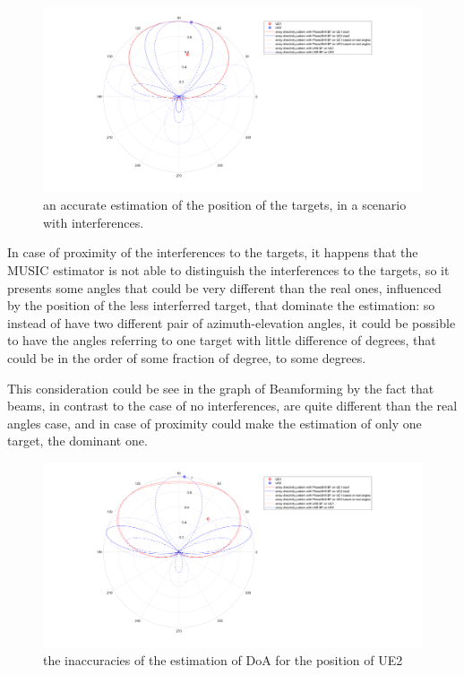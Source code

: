 \documentclass[a4paper,10pt]{article}
\begin{document}
\begin{figure}[H]
	\centering
	\includegraphics[width=0.8\linewidth]{complete_polarplot8.png}
	\caption{\label{fig:complete_polarplot8} an accurate estimation of the position of the targets, in a scenario with interferences.}
\end{figure}

In case of proximity of the interferences to the targets, it happens that the MUSIC estimator is not able to distinguish the interferences to the targets, so it presents some angles that could be very different than the real ones, influenced by the position of the less interferred target, that dominate the estimation: so instead of have two different pair of azimuth-elevation angles, it could be possible to have the angles referring to one target with little difference of degrees, that could be in the order of some fraction of degree, to some degrees.

This consideration could be see in the graph of Beamforming by the fact that beams, in contrast to the case of no interferences, are quite different than the real angles case, and in case of proximity could make the estimation of only one target, the dominant one.

\begin{figure}[H]
	\centering
	\includegraphics[width=0.8\linewidth]{complete_polarplot6.png}
	\caption{\label{fig:complete_polarplot6}the inaccuracies of the estimation of DoA for the position of UE2}
\end{figure}
\end{document}
